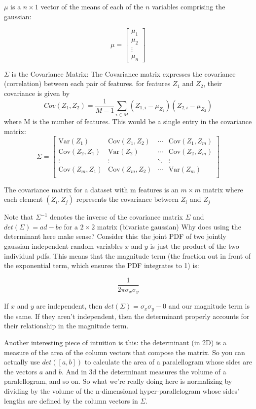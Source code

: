 \documentclass[12pt]{article}
\begin{document}
\(\mu\) is a \(n \times 1\) vector of the means of each of the \(n\) variables comprising the gaussian:

\[\mu = \left[ \begin{array}{c} \mu_1 \\ \mu_2 \\ \vdots \\ \mu_n \end{array}\right]\]

\(\Sigma\) is the Covariance Matrix:
The Covariance matrix expresses the covariance (correlation) between each pair of features. for features \(Z_1\) and \(Z_2\), their covariance is given by \[Cov(Z_1,Z_2) = \frac{1}{M-1} \sum_{i \in M} (Z_{1,i} - \mu_{Z_1})(Z_{2,i} - \mu_{Z_2})\]
where M is the number of features. This would be a single entry in the covariance matrix:
\[ \Sigma = 
\left[
\begin{array}{cccc}
\text{Var}(Z_1) & \text{Cov}(Z_1, Z_2) & \cdots & \text{Cov}(Z_1, Z_m) \\
\text{Cov}(Z_2, Z_1) & \text{Var}(Z_2) & \cdots & \text{Cov}(Z_2, Z_m) \\
\vdots & \vdots & \ddots & \vdots \\
\text{Cov}(Z_m, Z_1) & \text{Cov}(Z_m, Z_2) & \cdots & \text{Var}(Z_m) \\
\end{array}
\right]
\]

The covariance matrix for a dataset with m features is an \( m \times m \) matrix where each element \((Z_i,Z_j)\) represents the covariance between  \(Z_i\) and \(Z_j\)  

Note that \( \Sigma^{-1}\) denotes the inverse of the covariance matrix \(\Sigma\) and \(det(\Sigma) = ad - bc\) for a \(2 \times 2\) matrix (bivariate gaussian) Why does using the determinant here make sense? Consider this: the joint PDF of two jointly gaussian independent random variables \(x\) and \(y\) is just the product of the two individual pdfs. This means that the magnitude term (the fraction out in front of the exponential term, which ensures the PDF integrates to 1) is:

\[\frac{1}{2\pi \sigma_x \sigma_y}\]

If  \(x\) and \(y\) are independent, then \(det(\Sigma) = \sigma_x \sigma_y - 0\) and our magnitude term is the same. If they aren't independent, then the determinant properly accounts for their relationship in the magnitude term.  

Another interesting piece of intuition is this: the determinant (in 2D) is a measure of the area of the column vectors that compose the matrix. So you can actually use \(det([a,b])\) to calculate the area of a paralellogram whose sides are the vectors \(a\) and \(b\). And in 3d the determinant measures the volume of a paralellogram, and so on. So what we're really doing here is normalizing by dividing by the volume of the n-dimensional hyper-parallelogram whose sides' lengths are defined by the column vectors in \(\Sigma\). 
\end{document}
